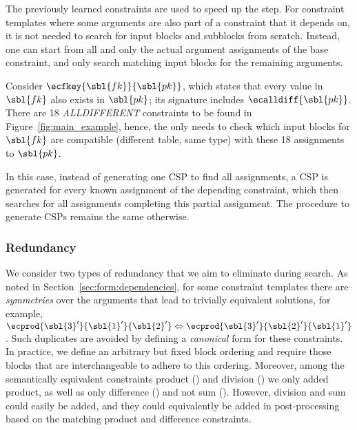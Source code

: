 The previously learned constraints are used to speed up the \generategroups step.
For constraint templates where some arguments are also part of a constraint that it depends on, it is not needed to search for input blocks and subblocks from scratch.
Instead, one can start from all and only the actual argument assignments of the base constraint, and only search matching input blocks for the remaining arguments.

\begin{example}
  Consider $\ecfkey{\sbl{fk}}{\sbl{pk}}$, which states that every value in $\sbl{fk}$ also exists in $\sbl{pk}$; its signature includes $\ecalldiff{\sbl{pk}}$. There are 18 \textit{ALLDIFFERENT} constraints to be found in Figure~\ref{fig:main_example}, hence, the \generategroups only needs to check which input blocks for $\sbl{fk}$ are compatible (different table, same type) with these 18 assignments to $\sbl{pk}$.
\end{example}

In this case, instead of generating one CSP to find all assignments, a CSP is generated for every known assignment of the depending constraint, which then searches for all assignments completing this partial assignment.
The procedure to generate CSPs remains the same otherwise.





\subsubsection{Redundancy}
We consider two types of redundancy that we aim to eliminate during search.
As noted in Section~\ref{sec:form:dependencies}, for some constraint templates there are \textit{symmetries} over the arguments that lead to trivially equivalent solutions, for example, $\ecprod{\sbl{3}'}{\sbl{1}'}{\sbl{2}'} \Leftrightarrow \ecprod{\sbl{3}'}{\sbl{2}'}{\sbl{1}'}$.
Such duplicates are avoided by defining a \textit{canonical} form for these constraints.
In practice, we define an arbitrary but fixed block ordering and require those blocks that are interchangeable to adhere to this ordering.
Moreover, among the semantically equivalent constraints product () and division () we only added product, as well as only difference () and not sum (). However, division and sum could easily be added, and they could equivalently be added in post-processing based on the matching product and difference constraints.


